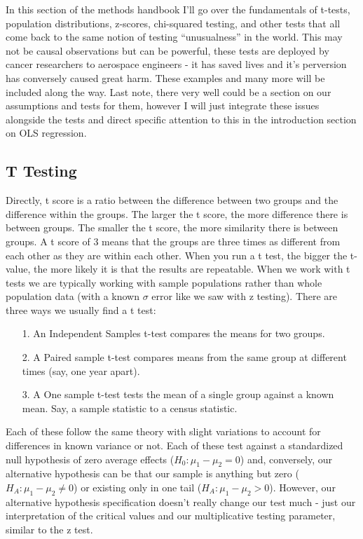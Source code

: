 \documentclass[12pt]{article}\usepackage[]{graphicx}\usepackage[]{color}
\begin{document}
\begin{flushleft}
In this section of the methods handbook I'll go over the fundamentals of t-tests, population distributions, z-scores, chi-squared testing, and other tests that all come back to the same notion of testing ``unusualness'' in the world. This may not be causal observations but can be powerful, these tests are deployed by cancer researchers to aerospace engineers - it has saved lives and it's perversion has conversely caused great harm. These examples and many more will be included along the way. Last note, there very well could be a section on our assumptions and tests for them, however I will just integrate these issues alongside the tests and direct specific attention to this in the introduction section on OLS regression.

\subsection{T Testing}

Directly, t score is a ratio between the difference between two groups and the difference within the groups. The larger the t score, the more difference there is between groups. The smaller the t score, the more similarity there is between groups. A t score of 3 means that the groups are three times as different from each other as they are within each other. When you run a t test, the bigger the t-value, the more likely it is that the results are repeatable. When we work with t tests we are typically working with sample populations rather than whole population data (with a known $\sigma$ error like we saw with z testing). There are three ways we usually find a t test:

\begin{itemize}
\item[1.] An Independent Samples t-test compares the means for two groups.
\item[2.] A Paired sample t-test compares means from the same group at different times (say, one year apart).
\item[3.] A One sample t-test tests the mean of a single group against a known mean. Say, a sample statistic to a census statistic.
\end{itemize}

Each of these follow the same theory with slight variations to account for differences in known variance or not. Each of these test against a standardized null hypothesis of zero average effects ($ H_0 : \mu_1 - \mu_2 = 0$) and, conversely, our alternative hypothesis can be that our sample is anything but zero ($H_A : \mu_1 - \mu_2 \neq 0$) or existing only in one tail ($H_A : \mu_1 - \mu_2 > 0$). However, our alternative hypothesis specification doesn't really change our test much - just our interpretation of the critical values and our multiplicative testing parameter, similar to the z test.


\end{flushleft}
\end{document}
